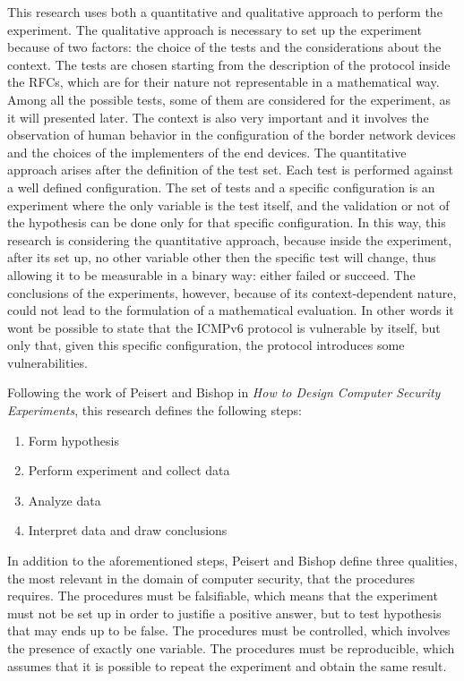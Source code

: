 \documentclass[12pt]{article}
\begin{document}
This research uses both a quantitative and qualitative approach to perform the experiment. The qualitative approach is necessary to set up the experiment because of two factors: the choice of the tests and the considerations about the context. The tests are chosen starting from the description of the protocol inside the RFCs, which are for their nature not representable in a mathematical way. Among all the possible tests, some of them are considered for the experiment, as it will presented later. The context is also very important and it involves the observation of human behavior in the configuration of the border network devices and the choices of the implementers of the end devices. The quantitative approach arises after the definition of the test set. Each test is performed against a well defined configuration. The set of tests and a specific configuration is an experiment where the only variable is the test itself, and the validation or not of the hypothesis can be done only for that specific configuration. In this way, this research is considering the quantitative approach, because inside the experiment, after its set up, no other variable other then the specific test will change, thus allowing it to be measurable in a binary way: either failed or succeed. The conclusions of the experiments, however, because of its context-dependent nature, could not lead to the formulation of a mathematical evaluation. In other words it wont be possible to state that the ICMPv6 protocol is vulnerable by itself, but only that, given this specific configuration, the protocol introduces some vulnerabilities.

Following the work of Peisert and Bishop in \textit{How to Design Computer Security Experiments}, this research defines the following steps:
\vspace{-10pt}
\begin{enumerate}[noitemsep,topsep=0pt,partopsep=0pt]
 \item Form hypothesis
 \item Perform experiment and collect data
 \item Analyze data
 \item Interpret data and draw conclusions
\end{enumerate}

In addition to the aforementioned steps, Peisert and Bishop define three qualities, the most relevant in the domain of computer security, that the procedures requires. The procedures must be falsifiable, which means that the experiment must not be set up in order to justifie a positive answer, but to test hypothesis that may ends up to be false. The procedures must be controlled, which involves the presence of exactly one variable. The procedures must be reproducible, which assumes that it is possible to repeat the experiment and obtain the same result.\cite{secExperiments}
\end{document}
